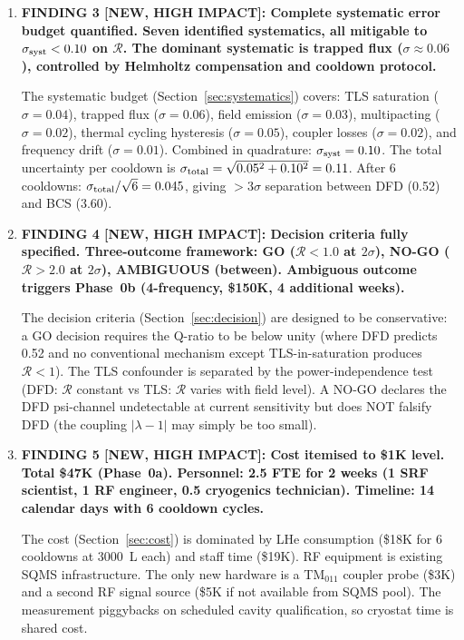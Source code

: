 \documentclass[11pt]{article}
\theoremstyle{definition}
\theoremstyle{remark}
\begin{document}
\begin{tcolorbox}[colback=blue!5!white, colframe=blue!60!black,
  title=\textbf{W4i17 TOP 5 FINDINGS --- Ranked by Programme Impact}]
\begin{enumerate}
The DFD spectrum dips at TE$_{011}$ (poor equatorial overlap) and
partially recovers at TM$_{011}$. No conventional mechanism produces
this non-monotonic pattern. The 4-frequency shape test
(Section~\ref{sec:multimode}) provides model discrimination even
if individual $\mathcal{R}$ values carry 20\% systematics.

\item \textbf{FINDING 3 [NEW, HIGH IMPACT]: Complete systematic error
budget quantified. Seven identified systematics, all mitigable to
$\sigma_{\rm syst} < 0.10$ on $\mathcal{R}$. The dominant systematic
is trapped flux ($\sigma \approx 0.06$), controlled by Helmholtz
compensation and cooldown protocol.}

The systematic budget (Section~\ref{sec:systematics}) covers:
TLS saturation ($\sigma = 0.04$), trapped flux ($\sigma = 0.06$),
field emission ($\sigma = 0.03$), multipacting ($\sigma = 0.02$),
thermal cycling hysteresis ($\sigma = 0.05$), coupler losses
($\sigma = 0.02$), and frequency drift ($\sigma = 0.01$). Combined
in quadrature: $\sigma_{\rm syst} = 0.10$. The total uncertainty
per cooldown is $\sigma_{\rm total} = \sqrt{0.05^2 + 0.10^2} = 0.11$.
After 6 cooldowns: $\sigma_{\rm total}/\sqrt{6} = 0.045$, giving
$>3\sigma$ separation between DFD (0.52) and BCS (3.60).

\item \textbf{FINDING 4 [NEW, HIGH IMPACT]: Decision criteria fully
specified. Three-outcome framework: GO ($\mathcal{R} < 1.0$ at
$2\sigma$), NO-GO ($\mathcal{R} > 2.0$ at $2\sigma$), AMBIGUOUS
(between). Ambiguous outcome triggers Phase~0b (4-frequency,
\$150K, 4 additional weeks).}

The decision criteria (Section~\ref{sec:decision}) are designed
to be conservative: a GO decision requires the Q-ratio to be below
unity (where DFD predicts 0.52 and no conventional mechanism except
TLS-in-saturation produces $\mathcal{R} < 1$). The TLS confounder
is separated by the power-independence test (DFD: $\mathcal{R}$
constant vs TLS: $\mathcal{R}$ varies with field level). A NO-GO
declares the DFD psi-channel undetectable at current sensitivity
but does NOT falsify DFD (the coupling $|\lambda - 1|$ may simply
be too small).

\item \textbf{FINDING 5 [NEW, HIGH IMPACT]: Cost itemised to \$1K
level. Total \$47K (Phase~0a). Personnel: 2.5 FTE for 2 weeks
(1 SRF scientist, 1 RF engineer, 0.5 cryogenics technician).
Timeline: 14 calendar days with 6 cooldown cycles.}

The cost (Section~\ref{sec:cost}) is dominated by LHe consumption
(\$18K for 6 cooldowns at 3000~L each) and staff time (\$19K).
RF equipment is existing SQMS infrastructure. The only new hardware
is a TM$_{011}$ coupler probe (\$3K) and a second RF signal source
(\$5K if not available from SQMS pool). The measurement piggybacks
on scheduled cavity qualification, so cryostat time is shared cost.

\end{enumerate}
\end{tcolorbox}
\end{document}
